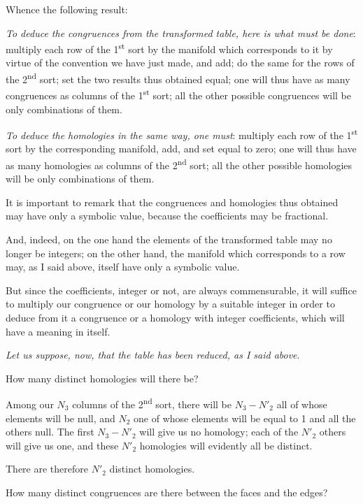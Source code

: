 \documentclass{article}
\begin{document}
Whence the following result:


\emph{To deduce the congruences from the transformed table, here is what must be done}: multiply each row of the 1\textsuperscript{st} sort by the manifold which corresponds to it by virtue of the convention we have just made, and add; do the same for the rows of the 2\textsuperscript{nd} sort; set the two results thus obtained equal; one will thus have as many congruences as columns of the 1\textsuperscript{st} sort; all the other possible congruences will be only combinations of them.

\emph{To deduce the homologies in the same way, one must}: multiply each row of the 1\textsuperscript{st} sort by the corresponding manifold, add, and set equal to zero; one will thus have as many homologies as columns of the 2\textsuperscript{nd} sort; all the other possible homologies will be only combinations of them.

It is important to remark that the congruences and homologies thus obtained may have only a symbolic value, because the coefficients may be fractional.

And, indeed, on the one hand the elements of the transformed table may no longer be integers; on the other hand, the manifold which corresponds to a row may, as I said above, itself have only a symbolic value.

But since the coefficients, integer or not, are always commensurable, it will suffice to multiply our congruence or our homology by a suitable integer in order to deduce from it a congruence or a homology with integer coefficients, which will have a meaning in itself.

\emph{Let us suppose, now, that the table has been reduced, as I said above}.

How many distinct homologies will there be?

Among our $N_{3}$ columns of the 2\textsuperscript{nd} sort, there will be $N_{3} - N'_{2}$ all of whose elements will be null, and $N_{2}$ one of whose elements will be equal to 1 and all the others null. The first $N_{3} - N'_{2}$ will give us no homology; each of the $N'_{2}$ others will give us one, and these $N'_{2}$ homologies will evidently all be distinct.

There are therefore $N'_{2}$ distinct homologies.

How many distinct congruences are there between the faces and the edges?
\end{document}
